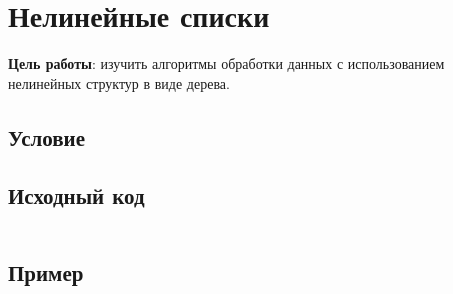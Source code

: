 
\usepackage{minted}





\section{Нелинейные списки}

\textbf{Цель работы}: изучить алгоритмы обработки данных с использованием нелинейных структур в виде дерева.

\subsection{Условие}



\subsection{Исходный код}
\inputminted[fontsize=\footnotesize,baselinestretch=1]{c}{../task.c}

\subsection{Пример}
\inputminted[fontsize=\fontsize{4}{12}]{text}{examples/example.txt}


